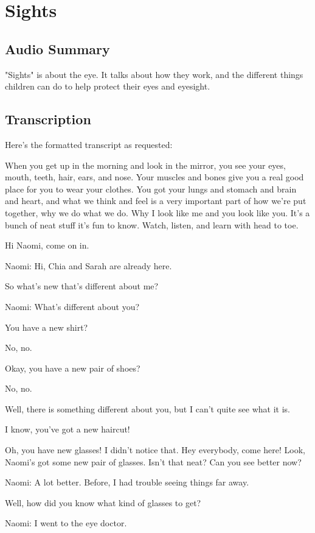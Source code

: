 \section{Sights}

\subsection{Audio Summary}

"Sights" is about the eye. It talks about how they work, and the different things children can do to help protect their eyes and eyesight.

\subsection{Transcription}

Here's the formatted transcript as requested:

When you get up in the morning and look in the mirror, you see your eyes, mouth, teeth, hair, ears, and nose. Your muscles and bones give you a real good place for you to wear your clothes. You got your lungs and stomach and brain and heart, and what we think and feel is a very important part of how we're put together, why we do what we do. Why I look like me and you look like you. It's a bunch of neat stuff it's fun to know. Watch, listen, and learn with head to toe.

Hi Naomi, come on in.

Naomi: Hi, Chia and Sarah are already here.

So what's new that's different about me?

Naomi: What's different about you?

You have a new shirt?

No, no.

Okay, you have a new pair of shoes?

No, no.

Well, there is something different about you, but I can't quite see what it is.

I know, you've got a new haircut!

Oh, you have new glasses! I didn't notice that. Hey everybody, come here! Look, Naomi's got some new pair of glasses. Isn't that neat? Can you see better now?

Naomi: A lot better. Before, I had trouble seeing things far away.

Well, how did you know what kind of glasses to get?

Naomi: I went to the eye doctor.

